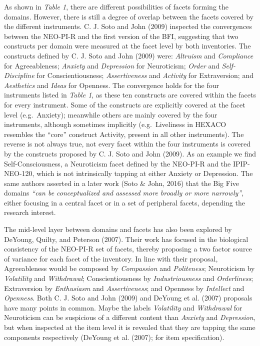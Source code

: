 \documentclass[,man,floatsintext]{apa6}
\begin{document}
\vspace{5mm}

As shown in \emph{Table 1}, there are different possibilities of facets
forming the domains. However, there is still a degree of overlap between
the facets covered by the different instruments. C. J. Soto and John
(2009) inspected the convergences between the NEO-PI-R and the first
version of the BFI, suggesting that two constructs per domain were
measured at the facet level by both inventories. The constructs defined
by C. J. Soto and John (2009) were: \emph{Altruism} and
\emph{Compliance} for Agreeableness; \emph{Anxiety} and
\emph{Depression} for Neuroticism; \emph{Order} and
\emph{Self-Discipline} for Conscientiousness; \emph{Assertiveness} and
\emph{Activity} for Extraversion; and \emph{Aesthetics} and \emph{Ideas}
for Openness. The convergence holds for the four instruments listed in
\emph{Table 1}, as these ten constructs are covered within the facets
for every instrument. Some of the constructs are explicitly covered at
the facet level (e.g.~Anxiety); meanwhile others are mainly covered by
the four instruments, although sometimes implicitly (e.g.~Liveliness in
HEXACO resembles the \enquote{core} construct Activity, present in all
other instruments). The reverse is not always true, not every facet
within the four instruments is covered by the constructs proposed by C.
J. Soto and John (2009). As an example we find Self-Consciousness, a
Neuroticism facet defined by the NEO-PI-R and the IPIP-NEO-120, which is
not intrinsically tapping at either Anxiety or Depression. The same
authors asserted in a later work (Soto \& John, 2016) that the Big Five
domains \emph{\enquote{can be conceptualized and assessed more broadly
or more narrowly}}, either focusing in a central facet or in a set of
peripheral facets, depending the research interest.

The mid-level layer between domains and facets has also been explored by
DeYoung, Quilty, and Peterson (2007). Their work has focused in the
biological consistency of the NEO-PI-R set of facets, thereby proposing
a two factor source of variance for each facet of the inventory. In line
with their proposal, Agreeableness would be composed by
\emph{Compassion} and \emph{Politeness}; Neuroticism by
\emph{Volatility} and \emph{Withdrawal}; Conscientiousness by
\emph{Industriousness} and \emph{Orderliness}; Extraversion by
\emph{Enthusiasm} and \emph{Assertiveness}; and Openness by
\emph{Intellect} and \emph{Openness}. Both C. J. Soto and John (2009)
and DeYoung et al. (2007) proposals have many points in common. Maybe
the labels \emph{Volatility} and \emph{Withdrawal} for Neuroticism can
be suspicious of a different content than \emph{Anxiety} and
\emph{Depression}, but when inspected at the item level it is revealed
that they are tapping the same components respectively (DeYoung et al.
(2007); for item specification).
\end{document}
